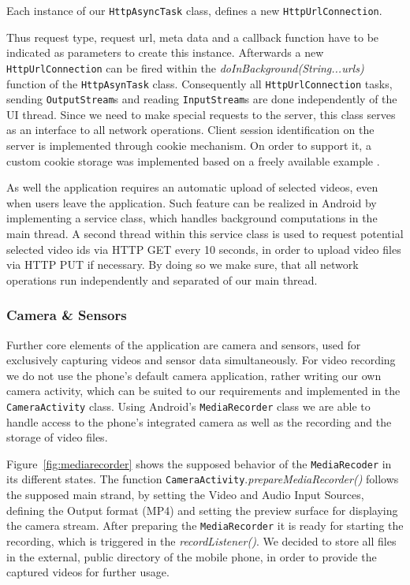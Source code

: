 \documentclass[conference]{IEEEtran}
\begin{document}
Each instance of our \texttt{HttpAsyncTask} class, defines a new \texttt{HttpUrlConnection}.

Thus request type, request url, meta data and a callback function have to be indicated as parameters to create this instance.
Afterwards a new \texttt{HttpUrlConnection} can be fired within the \textsl{doInBackground(String...urls)} function of the \texttt{HttpAsynTask} class. Consequently all \texttt{HttpUrlConnection} tasks,
sending \texttt{OutputStream}s and reading \texttt{InputStream}s are done independently of the UI thread.
Since we need to make special requests to the server, this class serves as an interface to all network operations.
Client session identification on the server is implemented through cookie mechanism. 
On order to support it, a custom cookie storage was implemented based on a freely available example \cite{so_java_cookies}.

As well the application requires an automatic upload of selected videos, even when users leave the application.
Such feature can be realized in Android by implementing a service class, which handles background computations in the main thread. 
A second thread within this service class is used to request potential selected video ids via HTTP GET every 10 seconds,
in order to upload video files via HTTP PUT if necessary.
By doing so we make sure, that all network operations run independently and separated of our main thread.

\subsubsection{Camera \& Sensors}
Further core elements of the application are camera and sensors, used for exclusively capturing videos and sensor data simultaneously.
For video recording we do not use the phone's default camera application,
rather writing our own camera activity, which can be suited to our requirements and implemented in the \texttt{CameraActivity} class.
Using Android's \texttt{MediaRecorder} class we are able to handle access to the phone's integrated camera
as well as the recording and the storage of video files.

Figure~\ref{fig:mediarecorder} \cite{mediarec_doc} shows the supposed behavior of the \texttt{MediaRecoder} in its different states. 
The function \texttt{CameraActivity}.\textsl{prepareMediaRecorder()} follows the supposed main strand,
by setting the Video and Audio Input Sources, defining the Output format (MP4) and setting the preview surface for displaying the camera stream.
After preparing the \texttt{MediaRecorder} it is ready for starting the recording, which is triggered in the \textsl{recordListener()}.
We decided to store all files in the external, public directory of the mobile phone, in order to provide the captured videos for further usage.
\end{document}
